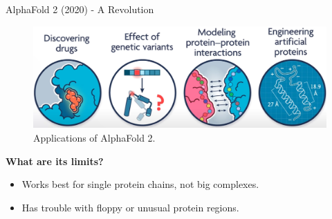 \begin{frame}[allowframebreaks]{AlphaFold 2 (2020) - A Revolution}
    \framebreak

    \begin{figure}
        \centering
        \includegraphics[width=\linewidth,height=0.85\textheight,keepaspectratio]{images/science/alphafold-2-applications.png}
        \caption*{Applications of AlphaFold 2.}
    \end{figure}

    \framebreak

    \textbf{What are its limits?}
    \begin{itemize}
        \item Works best for single protein chains, not big complexes.
        \item Has trouble with floppy or unusual protein regions.
    \end{itemize}
\end{frame}

